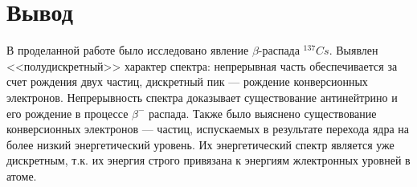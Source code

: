 \documentclass[a4paper, 12pt]{article}
\begin{document}
\section{Вывод}
В проделанной работе было исследовано явление $\beta$-распада $^{137}Cs$. Выявлен <<полудискретный>> характер спектра: непрерывная часть обеспечивается за счет рождения двух частиц, дискретный пик --- рождение конверсионных электронов.
		Непрерывность спектра доказывает существование антинейтрино и его рождение в процессе $\beta^-$ распада. Также было выяснено существование конверсионных электронов --- частиц, испускаемых в результате перехода ядра на более низкий энергетический уровень. Их энергетический спектр является уже дискретным, т.к. их энергия строго привязана к энергиям жлектронных уровней в атоме.
\end{document}
